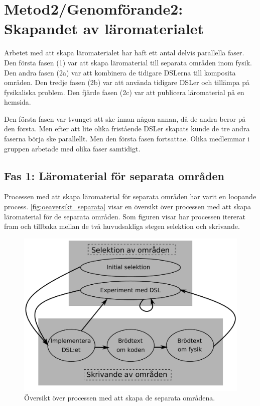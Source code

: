 
\chapter{Metod2/Genomförande2: Skapandet av läromaterialet}
\begin{draft}

Arbetet med att skapa läromaterialet har haft ett antal delvis parallella faser. Den första fasen (1) var att skapa läromaterial till separata områden inom fysik. Den andra fasen (2a) var att kombinera de tidigare DSLerna till komposita områden. Den tredje fasen (2b) var att använda tidigare DSLer och tillämpa på fysikaliska problem. Den fjärde fasen (2c) var att publicera läromaterial på en hemsida.

Den första fasen var tvunget att ske innan någon annan, då de andra beror på den första. Men efter att lite olika fristående DSLer skapats kunde de tre andra faserna börja ske parallellt. Men den första fasen fortsattae. Olika medlemmar i gruppen arbetade med olika faser samtidigt.

\section{Fas 1: Läromaterial för separata områden}

Processen med att skapa läromaterial för separata områden har varit en loopande process. \ref{fig:oeaversikt_separata} visar en översikt över processen med att skapa läromaterial för de separata områden. Som figuren visar har processen itererat fram och tillbaka mellan de två huvudsakliga stegen selektion och skrivande.

\begin{figure}
  \includegraphics[width=\linewidth]{figure/oeversikt_metod_process.pdf}
  \caption{Översikt över processen med att skapa de separata områdena.}
  \label{fig:oeversikt_separata}
\end{figure}


\end{draft}
